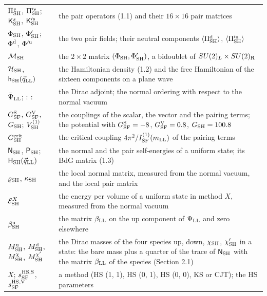 \documentclass[
  10pt,
]{article}
\begin{document}
\begin{longtable}[]{@{}
  >{\raggedright\arraybackslash}p{}
  >{\raggedright\arraybackslash}p{}@{}}
\(\Pi^s_{\rm SH}\), \(\Pi'^s_{\rm SH}\); \(\mathsf K^s_{\rm SH}\),
\(\mathsf K'^s_{\rm SH}\) & the pair operators (1.1) and their
\(16\times16\) pair matrices \\
\(\Phi_{\rm SH}\), \(\Phi'_{\rm SH}\); \(\Phi^{\rm d}\),
\(\Phi'^{\rm u}\) & the two pair fields; their neutral components
\(\langle\Pi^{\rm d}_{\rm SH}\rangle\),
\(\langle\Pi'^{\rm u}_{\rm SH}\rangle\) \\
\(\mathcal M_{\rm SH}\) & the \(2\times2\) matrix
\((\Phi_{\rm SH},\Phi'_{\rm SH})\), a bidoublet of
\(SU(2)_L\times SU(2)_{\rm R}\) \\
\(\mathcal H_{\rm SH}\), \(\mathsf h_{\rm SH}(\vec q_{\rm LL})\) & the
Hamiltonian density (1.2) and the free Hamiltonian of the sixteen
components on a plane wave \\
\(\bar\Psi_{\rm LL}\); \({:}\ {:}\) & the Dirac adjoint; the normal
ordering with respect to the normal vacuum \\
\(G^{\rm S}_{\rm SF}\), \(G^{\rm V}_{\rm SF}\), \(G_{\rm SH}\);
\(V^{(1)}_{\rm SH}\) & the couplings of the scalar, the vector and the
pairing terms; the potential with \(G^{\rm S}_{\rm SF}=-8\),
\(G^{\rm V}_{\rm SF}=0.8\), \(G_{\rm SH}=100.8\) \\
\(G^{\rm crit}_{\rm SH}\) & the critical coupling
\(4\pi^2/I^{(1)}_{\rm SF}(m_{\rm LL})\) of the pairing terms \\
\(\mathsf N_{\rm SH}\), \(\mathsf P_{\rm SH}\);
\(\mathsf H_{\rm SH}(\vec q_{\rm LL})\) & the normal and the pair
self-energies of a uniform state; its BdG matrix (1.3) \\
\(\varrho_{\rm SH}\), \(\kappa_{\rm SH}\) & the local normal matrix,
measured from the normal vacuum, and the local pair matrix \\
\(\mathcal E^X_{\rm SH}\) & the energy per volume of a uniform state in
method \(X\), measured from the normal vacuum \\
\(\beta^{\rm u}_{\rm SH}\) & the matrix \(\beta_{\rm LL}\) on the up
component of \(\Psi_{\rm LL}\) and zero elsewhere \\
\(M^{\rm u}_{\rm SH}\), \(M^{\rm d}_{\rm SH}\), \(M^\chi_{\rm SH}\),
\(M^{\chi'}_{\rm SH}\) & the Dirac masses of the four species up, down,
\(\chi_{\rm SH}\), \(\chi'_{\rm SH}\) in a state: the bare mass plus a
quarter of the trace of \(\mathsf N_{\rm SH}\) with the matrix
\(\beta_{\rm LL}\) of the species (Section 2.1) \\
\(X\); \(s^{\rm HS,S}_{\rm SF}\), \(s^{\rm HS,V}_{\rm SF}\) & a method
(HS (1, 1), HS (0, 1), HS (0, 0), KS or CJT); the HS parameters \\

\end{longtable}
\end{document}
